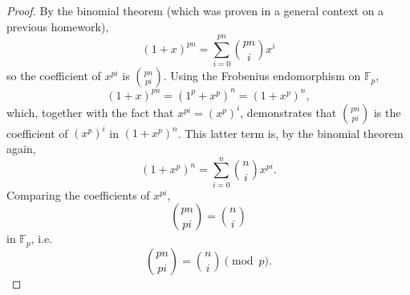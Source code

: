 \documentclass{article}
\begin{document}
\begin{proof}
  By the binomial theorem (which was proven in a general context on a previous homework),
  \[
    (1 + x)^{pn} = \sum_{i = 0}^{pn} \binom{pn}{i}x^{i}
  \]
  so the coefficient of $x^{pi}$ is $\binom{pn}{pi}$.
  Using the Frobenius endomorphism on $\mathbb{F}_{p}$,
  \[
    (1 + x)^{pn} = (1^{p} + x^{p})^{n} = (1 + x^{p})^{n},
  \]
  which, together with the fact that $x^{pi} = (x^{p})^{i}$, demonstrates that $\binom{pn}{pi}$ is the coefficient of $(x^{p})^{i}$
  in $(1 + x^{p})^{n}$.
  This latter term is, by the binomial theorem again,
  \[
    (1 + x^{p})^{n} = \sum_{i = 0}^{n} \binom{n}{i}x^{pi}.
  \]
  Comparing the coefficients of $x^{pi}$,
  \[
    \binom{pn}{pi} = \binom{n}{i}
  \]
  in $\mathbb{F}_{p}$, i.e.
  \[
    \binom{pn}{pi} = \binom{n}{i} \pmod p.
  \]
\end{proof}
\end{document}
